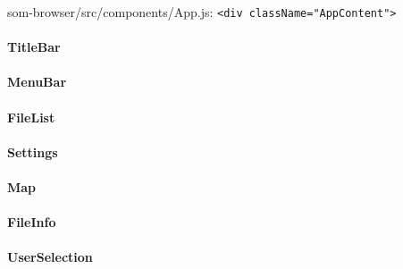 \begin{listing}[!htb]
  \begin{mdframed}
    \inputminted[numbers=left, firstline=400, lastline=460,
    fontsize=\scriptsize]{jsx}{../dev/som-browser/src/components/App.js}
  \end{mdframed}
  \caption{som-browser/src/components/App.js:
  \texttt{<div className="AppContent">}}
  \label{lst:som-browser_app_content}
\end{listing}

\paragraph{TitleBar}
\label{para:title_bar}

\paragraph{MenuBar}
\label{para:menu_bar}

\paragraph{FileList}
\label{para:file_list}

\paragraph{Settings}
\label{para:settings}

\paragraph{Map}
\label{para:map}

\paragraph{FileInfo}
\label{para:file_info}

\paragraph{UserSelection}
\label{para:user_selection}
